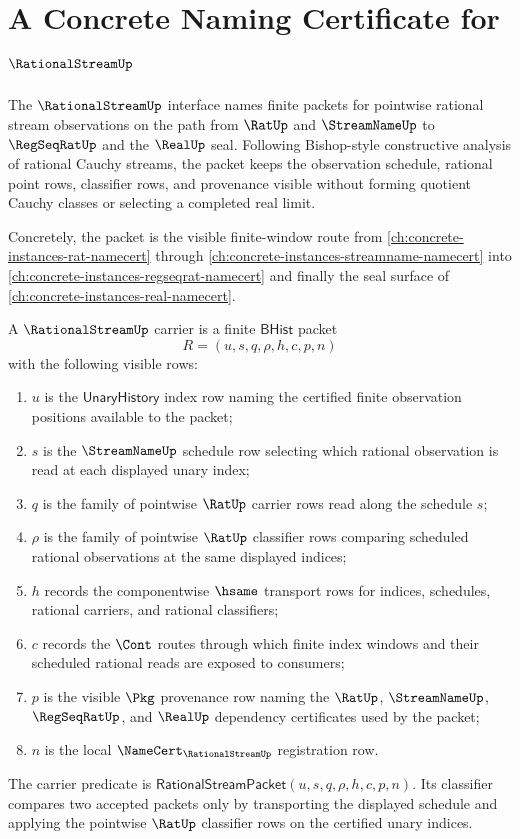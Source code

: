 \chapter{A Concrete Naming Certificate for $\RationalStreamUp$}
\label{ch:concrete-instances-rationalstream-namecert}

The $\RationalStreamUp$ interface names finite packets for pointwise rational
stream observations on the path from $\RatUp$ and $\StreamNameUp$ to
$\RegSeqRatUp$ and the $\RealUp$ seal. Following Bishop-style constructive
analysis of rational Cauchy streams, the packet keeps the observation
schedule, rational point rows, classifier rows, and provenance visible without
forming quotient Cauchy classes or selecting a completed real limit.

Concretely, the packet is the visible finite-window route from
\autoref{ch:concrete-instances-rat-namecert} through
\autoref{ch:concrete-instances-streamname-namecert} into
\autoref{ch:concrete-instances-regseqrat-namecert} and finally the seal surface
of \autoref{ch:concrete-instances-real-namecert}.

\begin{definition}
\label{def:rational-stream-carrier}
A $\RationalStreamUp$ carrier is a finite $\mathsf{BHist}$ packet
$$
R=(u,s,q,\rho,h,c,p,n)
$$
with the following visible rows:
\begin{enumerate}
\item $u$ is the $\mathsf{UnaryHistory}$ index row naming the certified
finite observation positions available to the packet;
\item $s$ is the $\StreamNameUp$ schedule row selecting which rational
observation is read at each displayed unary index;
\item $q$ is the family of pointwise $\RatUp$ carrier rows read along the
schedule $s$;
\item $\rho$ is the family of pointwise $\RatUp$ classifier rows comparing
scheduled rational observations at the same displayed indices;
\item $h$ records the componentwise $\hsame$ transport rows for indices,
schedules, rational carriers, and rational classifiers;
\item $c$ records the $\Cont$ routes through which finite index windows and
their scheduled rational reads are exposed to consumers;
\item $p$ is the visible $\Pkg$ provenance row naming the $\RatUp$,
$\StreamNameUp$, $\RegSeqRatUp$, and $\RealUp$ dependency certificates used
by the packet;
\item $n$ is the local $\NameCert_{\RationalStreamUp}$ registration row.
\end{enumerate}
The carrier predicate is
$\mathsf{RationalStreamPacket}(u,s,q,\rho,h,c,p,n)$. Its classifier compares
two accepted packets only by transporting the displayed schedule and applying
the pointwise $\RatUp$ classifier rows on the certified unary indices.
\end{definition}

